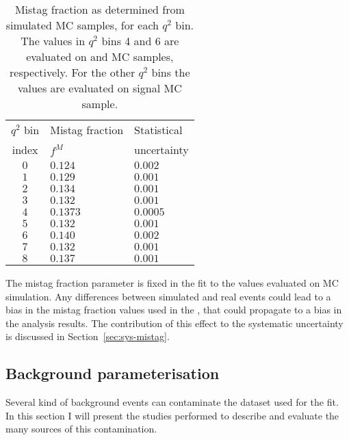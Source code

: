 \begin{table}[!htb]
  \begin{center}
      \caption{Mistag fraction as determined from simulated MC samples, for each $q^2$ bin.
        The values in $q^2$ bins 4 and 6 are evaluated on \BtoKstJpsimumu and \BtoKstpsipmumu MC samples, respectively. For the other $q^2$ bins the values are evaluated on signal MC sample.
        \label{tab:mistag}}
      \begin{tabular}{c|l|l}
        $q^2$ bin & Mistag fraction & Statistical \\
        index     & $f^M$           & uncertainty \\
        \hline
        $0$ & $0.124$  & $0.002$  \\
        $1$ & $0.129$  & $0.001$  \\
        $2$ & $0.134$  & $0.001$  \\
        $3$ & $0.132$  & $0.001$  \\
        $4$ & $0.1373$ & $0.0005$ \\
        $5$ & $0.132$  & $0.001$  \\
        $6$ & $0.140$  & $0.002$  \\
        $7$ & $0.132$  & $0.001$  \\
        $8$ & $0.137$  & $0.001$  \\
      \end{tabular}
  \end{center}
\end{table}

The mistag fraction parameter is fixed in the fit to the values evaluated on MC simulation.
Any differences between simulated and real events could lead to a bias in the mistag fraction values used in the \pdf, that could propagate to a bias in the analysis results.
The contribution of this effect to the systematic uncertainty is discussed in Section~\ref{sec:sys-mistag}.

\subsection{Background parameterisation}
\label{sec:backg}

Several kind of background events can contaminate the dataset used for the fit.
In this section I will present the studies performed to describe and evaluate the many sources of this contamination.

